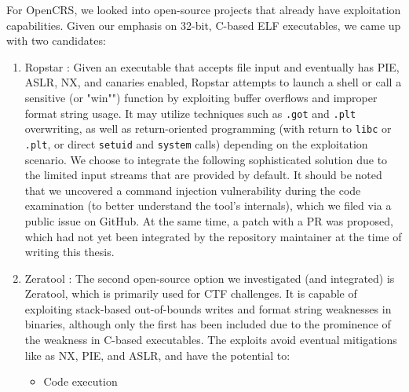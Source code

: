 \documentclass[../main.tex]{subfiles}
\begin{document}
For OpenCRS, we looked into open-source projects that already have exploitation
capabilities. Given our emphasis on 32-bit, C-based ELF executables, we came up
with two candidates:

\begin{enumerate}
  \def\labelenumi{\arabic{enumi}.}
  \item
        Ropstar : Given an executable that accepts file input and
        eventually has PIE, ASLR, NX, and canaries enabled, Ropstar attempts
        to launch a shell or call a sensitive (or "win"") function by
        exploiting buffer overflows and improper format string usage. It may
        utilize techniques such as \texttt{.got} and \texttt{.plt}
        overwriting, as well as return-oriented programming (with return to
        \texttt{libc} or \texttt{.plt}, or direct \texttt{setuid} and
        \texttt{system} calls) depending on the exploitation scenario. We
        choose to integrate the following sophisticated solution due to the
        limited input streams that are provided by default. It should be noted
        that we uncovered a command injection vulnerability during the code
        examination (to better understand the tool's internals), which we
        filed via a public issue  on GitHub. At the same time, a patch
        with a PR  was proposed, which had not yet been integrated by
        the repository maintainer at the time of writing this thesis.
  \item
        Zeratool \cite{zeratool}: The second open-source option we investigated (and
        integrated) is Zeratool, which is primarily used for CTF challenges.
        It is capable of exploiting stack-based out-of-bounds writes and
        format string weaknesses in binaries, although only the first has been
        included due to the prominence of the weakness in C-based executables.
        The exploits avoid eventual mitigations like as NX, PIE, and ASLR, and
        have the potential to:

        \begin{itemize}
          \tightlist
          \item
                Code execution


\end{itemize}
\end{enumerate}
\end{document}
